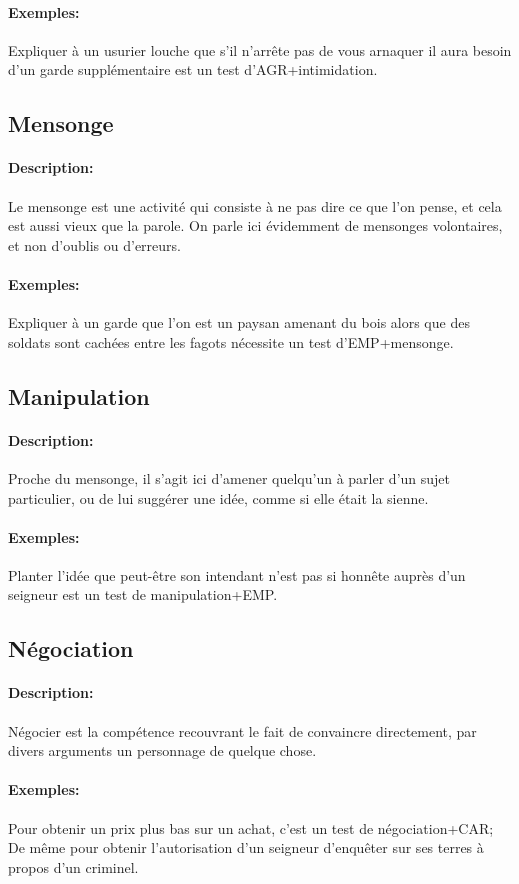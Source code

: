 \documentclass[10pt,a4paper,twocolumn]{book}
\begin{document}
\paragraph{Exemples:}Expliquer à un usurier louche que s'il n'arrête pas de vous arnaquer il aura besoin d'un garde supplémentaire est un test d'AGR+intimidation.
\subsection{Mensonge}
\paragraph{Description:}Le mensonge est une activité qui consiste à ne pas dire ce que l'on pense, et cela est aussi vieux que la parole. On parle ici évidemment de mensonges volontaires, et non d'oublis ou d'erreurs.
\paragraph{Exemples:}Expliquer à un garde que l'on est un paysan amenant du bois alors que des soldats sont cachées entre les fagots nécessite un test d'EMP+mensonge.
\subsection{Manipulation}
\paragraph{Description:}Proche du mensonge, il s'agit ici d'amener quelqu'un à parler d'un sujet particulier, ou de lui suggérer une idée, comme si elle était la sienne.
\paragraph{Exemples:}Planter l'idée que peut-être son intendant n'est pas si honnête auprès d'un seigneur est un test de manipulation+EMP.
\subsection{Négociation}
\paragraph{Description:}Négocier est la compétence recouvrant le fait de convaincre directement, par divers arguments un personnage de quelque chose.
\paragraph{Exemples:}Pour obtenir un prix plus bas sur un achat, c'est un test de négociation+CAR; De même pour obtenir l'autorisation d'un seigneur d'enquêter sur ses terres à propos d'un criminel.
\end{document}
